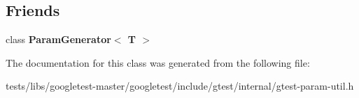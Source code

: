 \subsection*{Friends}
\begin{DoxyCompactItemize}
\item 
\mbox{\label{classtesting_1_1internal_1_1ParamIterator_ab73a355ae191f2f7eab54b65ca557714}} 
class {\bfseries Param\+Generator$<$ T $>$}
\end{DoxyCompactItemize}


The documentation for this class was generated from the following file\+:\begin{DoxyCompactItemize}
\item 
tests/libs/googletest-\/master/googletest/include/gtest/internal/gtest-\/param-\/util.\+h\end{DoxyCompactItemize}
